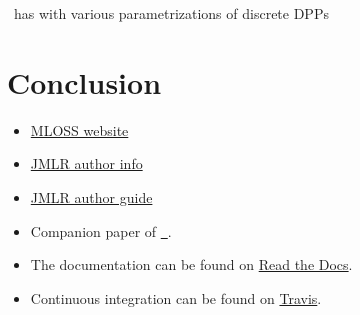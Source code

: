 \documentclass[twoside,11pt]{article}
\begin{document}
  \DPPy\ has with various parametrizations of discrete DPPs



\section{Conclusion} %
\label{sec:conclusion}










\newpage

  \begin{itemize}
    \item \href{http://www.jmlr.org/mloss/mloss-info.html}{MLOSS website}
    \item \href{http://jmlr.csail.mit.edu/author-info.html}{JMLR author info}
    \item \href{http://www.jmlr.org/format/authors-guide.html}{JMLR author guide} 
  \end{itemize}

  \begin{itemize}
    \item Companion paper of \href{https://github.com/guilgautier/DPPy}{\DPPy\ \faGithub}.
    \item The documentation can be found on \href{https://dppy.readthedocs.io/en/latest/?badge=latest}{Read the Docs}.
    \item Continuous integration can be found on \href{https://travis-ci.com/guilgautier/DPPy}{Travis}.
  \end{itemize}

\newpage



\end{document}
